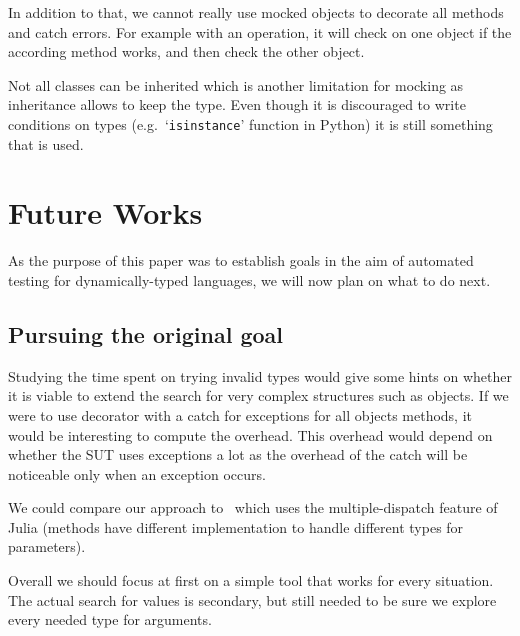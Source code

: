 \documentclass{llncs2e/llncs}
\makeatletter
\def\todo#1{{\color{red}TODO\@: #1}}
\makeatother
\begin{document}
In addition to that, we cannot really use mocked objects to decorate all methods
and catch errors. For example with an operation, it will check on one object if
the according method works, and then check the other object.

Not all classes can be inherited which is another limitation for mocking as
inheritance allows to keep the type. Even though it is discouraged to write
conditions on types (e.g.\ `\texttt{isinstance}' function in Python) it is still
something that is used.







\section{Future Works}
\label{futureworks}

As the purpose of this paper was to establish goals in the aim of automated
testing for dynamically-typed languages, we will now plan on what to do next.

\subsection{Pursuing the original goal}

Studying the time spent on trying invalid types would give some hints on whether
it is viable to extend the search for very complex structures such as objects.
If we were to use decorator with a catch for exceptions for all objects methods,
it would be interesting to compute the overhead. This overhead would depend on
whether the SUT uses exceptions a lot as the overhead of the catch will be
noticeable only when an exception occurs.

We could compare our approach to~\cite{poulding2017automated} which uses the
multiple-dispatch feature of Julia (methods have different implementation to
handle different types for parameters).

Overall we should focus at first on a simple tool that works for every
situation. The actual search for values is secondary, but still needed to be
sure we explore every needed type for arguments.
\end{document}
